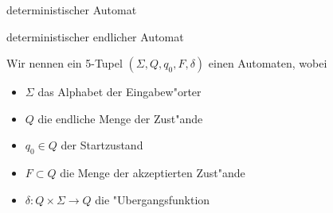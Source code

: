 \documentclass[class=article, crop=false]{standalone}
\begin{document}
\begin{zettel}{deterministischer Automat}
\begin{flashcard}[lt17usej]{deterministischer endlicher Automat}
	\begin{definition}
		Wir nennen ein 5-Tupel $(\Sigma,Q, q_0,F, \delta)$ einen Automaten, wobei
		\begin{itemize}
			\item $\Sigma$ das Alphabet der Eingabew"orter
			\item $Q$ die endliche Menge der Zust"ande
			\item $q_0 \in  Q$ der Startzustand
			\item $F \subset Q$ die Menge der akzeptierten Zust"ande
			\item $\delta: Q \times \Sigma \to Q$ die "Ubergangsfunktion
		\end{itemize}
	\end{definition}
\end{flashcard}
\end{zettel}
\end{document}
